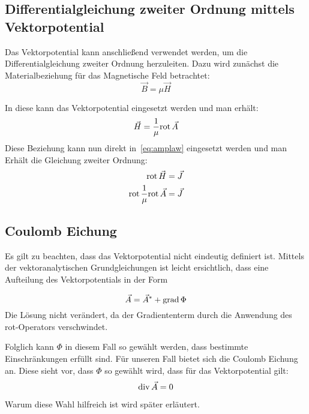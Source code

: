 \subsection{Differentialgleichung zweiter Ordnung mittels Vektorpotential}
Das Vektorpotential kann anschlie\ss{}end verwendet werden, um die Differentialgleichung zweiter Ordnung herzuleiten. Dazu wird zun\"achst die Materialbeziehung f\"ur das Magnetische Feld betrachtet:
\begin{equation}
	\vec{B} = \mu\vec{H} 
\end{equation}
\par
In diese kann das Vektorpotential eingesetzt werden und man erh\"alt:
\begin{equation}
	\vec{H} = \frac{1}{\mu} \mathrm{rot}\,\vec{A}
\end{equation}
Diese Beziehung kann nun direkt in~\ref{eq:amplaw} eingesetzt werden und man Erh\"alt die Gleichung zweiter Ordnung:
\begin{align}
	\mathrm{rot}\, \vec{H} &= \vec{J} \\
	\mathrm{rot}\, \frac{1}{\mu} \mathrm{rot}\,\vec{A} &= \vec{J}
\end{align}


\newpage


\subsection{Coulomb Eichung}
\label{sec:coul}
Es gilt zu beachten, dass das Vektorpotential nicht eindeutig definiert ist. Mittels der vektoranalytischen Grundgleichungen ist leicht ersichtlich, dass eine Aufteilung des Vektorpotentials in der Form 
\par
\begin{equation}
	\vec{A} = \vec{A}^{*} + \mathrm{grad}\,\Phi
\end{equation}
Die L\"osung nicht ver\"andert, da der Gradiententerm durch die Anwendung des rot-Operators verschwindet.
\par
Folglich kann $\Phi$ in diesem Fall so gew\"ahlt werden, dass bestimmte Einschr\"ankungen erf\"ullt sind. F\"ur unseren Fall bietet sich die Coulomb Eichung an. Diese sieht vor, dass $\Phi$ so gew\"ahlt wird, dass f\"ur das Vektorpotential gilt:
\begin{equation}
	\mathrm{div}\, \vec{A} = 0
\end{equation}
\par
Warum diese Wahl hilfreich ist wird sp\"ater erl\"autert.

